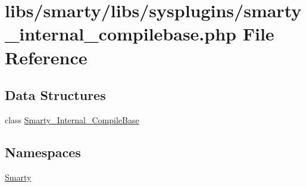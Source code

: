 \hypertarget{smarty__internal__compilebase_8php}{}\section{libs/smarty/libs/sysplugins/smarty\+\_\+internal\+\_\+compilebase.php File Reference}
\label{smarty__internal__compilebase_8php}
\subsection*{Data Structures}
\begin{DoxyCompactItemize}
\item 
class \hyperlink{class_smarty___internal___compile_base}{Smarty\+\_\+\+Internal\+\_\+\+Compile\+Base}
\end{DoxyCompactItemize}
\subsection*{Namespaces}
\begin{DoxyCompactItemize}
\item 
 \hyperlink{namespace_smarty}{Smarty}
\end{DoxyCompactItemize}
